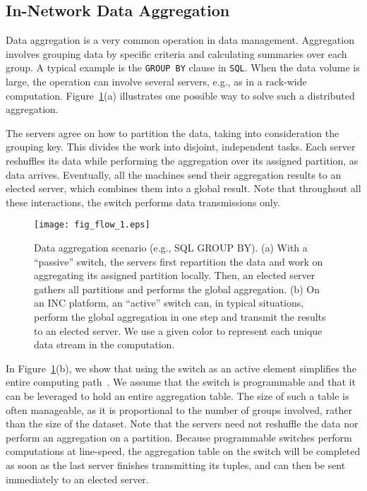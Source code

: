 \documentclass[11pt,dvipdfmx]{article}
\begin{document}
\subsection{In-Network Data Aggregation}
\label{ssec:aggr}

Data aggregation is a very common operation in data management.
Aggregation involves grouping data by specific criteria and calculating
summaries over each group.
A typical example is the \texttt{GROUP BY} clause in \texttt{SQL}.
When the data volume is large, the operation can involve several servers,
e.g., as in a rack-wide computation.
Figure~\ref{fig:flow_1}(a) illustrates one possible way to solve such a distributed
aggregation.


The servers agree on how to partition the data, taking into consideration the
grouping key.
This divides the work into disjoint, independent tasks.
Each server reshuffles its data while performing the aggregation over its
assigned partition, as data arrives.
Eventually, all the machines send their aggregation results to an elected
server, which combines them into a global result.
Note that throughout all these interactions, the switch performs data
transmissions only.


\begin{figure}[h]
    \centering
    \texttt{[image: fig\_flow\_1.eps]} %
    \caption{Data aggregation scenario (e.g., SQL GROUP BY).
      (a) With a ``passive'' switch, the servers first repartition the data
      and work on aggregating its assigned partition locally.
      Then, an elected server gathers all partitions and performs the global
      aggregation.
      (b) On an INC platform, an ``active'' switch can, in typical situations,
      perform the global aggregation in one step and transmit the results to an
      elected server.
      We use a given color to represent each unique data stream in the
      computation.
      }
    \label{fig:flow_1}
\end{figure}


In Figure~\ref{fig:flow_1}(b), we show that using the switch as an active
element simplifies the entire computing path~\cite{lerner19}.
We assume that the switch is programmable and that it can be leveraged to hold
an entire aggregation table.
The size of such a table is often manageable, as it is proportional to the
number of groups involved, rather than the size of the dataset.
Note that the servers need not reshuffle the data nor perform an aggregation on
a partition.
Because programmable switches perform computations at line-speed, the
aggregation table on the switch will be completed as soon as the last server
finishes transmitting its tuples, and can then be sent immediately to an elected
server.
\end{document}
